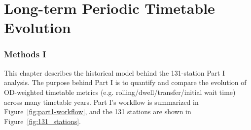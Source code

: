 \documentclass[preprint,12pt]{elsarticle}
\begin{document}
\part{Long-term Periodic Timetable Evolution}\label{sec:partI}
\section{Methods I}\label{sec:methods I}

This chapter describes the historical model behind the 131-station Part I analysis. The purpose behind Part I is to quantify and compare the evolution of OD-weighted timetable metrics (e.g. rolling/dwell/transfer/initial wait time) across many timetable years. Part I's workflow is summarized in Figure~\ref{fig:part1-workflow}, and the 131 stations are shown in Figure~\ref{fig:131_stations}.
\end{document}
